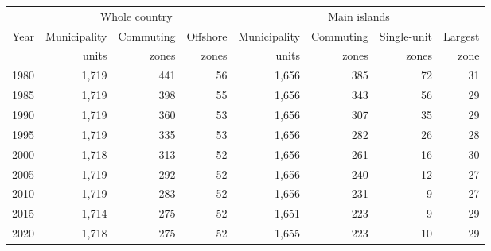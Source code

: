 \begin{tabular}{lrrrrrrr}
\hline\hline
& \multicolumn{3}{c}{Whole country} & \multicolumn{4}{c}{Main islands} \\\cline{2-4} \cline{5-8}Year & Municipality & Commuting & Offshore & Municipality & Commuting & Single-unit & Largest \\& units & zones & zones & units & zones & zones & zone \\
\hline
1980 & 1,719 & 441 & 56 & 1,656 & 385 & 72 & 31 \\
1985 & 1,719 & 398 & 55 & 1,656 & 343 & 56 & 29 \\
1990 & 1,719 & 360 & 53 & 1,656 & 307 & 35 & 29 \\
1995 & 1,719 & 335 & 53 & 1,656 & 282 & 26 & 28 \\
2000 & 1,718 & 313 & 52 & 1,656 & 261 & 16 & 30 \\
2005 & 1,719 & 292 & 52 & 1,656 & 240 & 12 & 27 \\
2010 & 1,719 & 283 & 52 & 1,656 & 231 & 9 & 27 \\
2015 & 1,714 & 275 & 52 & 1,651 & 223 & 9 & 29 \\
2020 & 1,718 & 275 & 52 & 1,655 & 223 & 10 & 29 \\
\hline\hline
\end{tabular}
